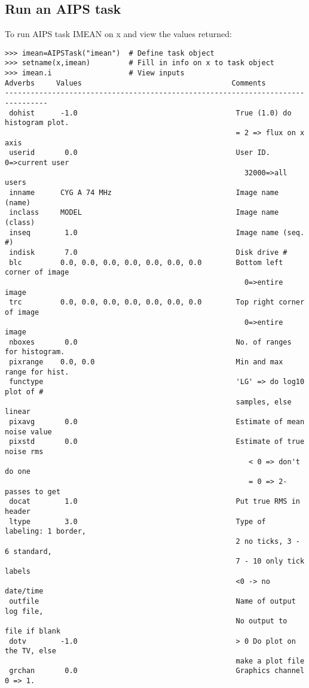 \documentclass[11pt]{report}
\begin{document}
\subsection{Run an AIPS task}
To run AIPS task IMEAN on x and view the values returned:
\begin{verbatim}
>>> imean=AIPSTask("imean")  # Define task object
>>> setname(x,imean)         # Fill in info on x to task object
>>> imean.i                  # View inputs
Adverbs     Values                                   Comments
--------------------------------------------------------------------------------
 dohist      -1.0                                     True (1.0) do histogram plot.
                                                      = 2 => flux on x axis
 userid       0.0                                     User ID.  0=>current user
                                                        32000=>all users
 inname      CYG A 74 MHz                             Image name (name)
 inclass     MODEL                                    Image name (class)
 inseq        1.0                                     Image name (seq. #)
 indisk       7.0                                     Disk drive #
 blc         0.0, 0.0, 0.0, 0.0, 0.0, 0.0, 0.0        Bottom left corner of image
                                                        0=>entire image
 trc         0.0, 0.0, 0.0, 0.0, 0.0, 0.0, 0.0        Top right corner of image
                                                        0=>entire image
 nboxes       0.0                                     No. of ranges for histogram.
 pixrange    0.0, 0.0                                 Min and max range for hist.
 functype                                             'LG' => do log10 plot of #
                                                      samples, else linear
 pixavg       0.0                                     Estimate of mean noise value
 pixstd       0.0                                     Estimate of true noise rms
                                                         < 0 => don't do one
                                                         = 0 => 2-passes to get
 docat        1.0                                     Put true RMS in header
 ltype        3.0                                     Type of labeling: 1 border,
                                                      2 no ticks, 3 - 6 standard,
                                                      7 - 10 only tick labels
                                                      <0 -> no date/time
 outfile                                              Name of output log file,
                                                      No output to file if blank
 dotv        -1.0                                     > 0 Do plot on the TV, else
                                                      make a plot file
 grchan       0.0                                     Graphics channel 0 => 1.


\end{verbatim}
\end{document}
